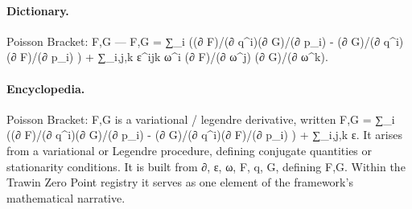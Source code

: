 \paragraph{Dictionary.}
Poisson Bracket: F,G — F,G = ∑\_i ((∂ F)/(∂ q\textasciicircum{}i)(∂ G)/(∂ p\_i) - (∂ G)/(∂ q\textasciicircum{}i)(∂ F)/(∂ p\_i) ) + ∑\_i,j,k ε\textasciicircum{}ijk ω\textasciicircum{}i (∂ F)/(∂ ω\textasciicircum{}j) (∂ G)/(∂ ω\textasciicircum{}k).

\paragraph{Encyclopedia.}
Poisson Bracket: F,G is a variational / legendre derivative, written F,G = ∑\_i ((∂ F)/(∂ q\textasciicircum{}i)(∂ G)/(∂ p\_i) - (∂ G)/(∂ q\textasciicircum{}i)(∂ F)/(∂ p\_i) ) + ∑\_i,j,k ε. It arises from a variational or Legendre procedure, defining conjugate quantities or stationarity conditions. It is built from ∂, ε, ω, F, q, G, defining F,G. Within the Trawin Zero Point registry it serves as one element of the framework's mathematical narrative.
